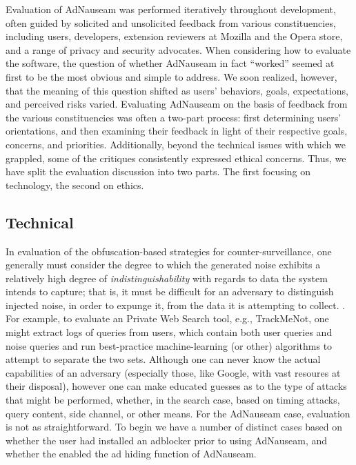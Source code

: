 \documentclass[conference]{IEEEtran}
\begin{document}
Evaluation of AdNauseam was performed iteratively throughout development, often guided by solicited and unsolicited feedback from various constituencies, including users, developers, extension reviewers at Mozilla and the Opera store, and a range of privacy and security advocates. When considering how to evaluate the software, the question of whether AdNauseam in fact ``worked'' seemed at first to be the most obvious and simple to address. We soon realized, however, that the meaning of this question shifted as users' behaviors, goals, expectations, and perceived risks varied. Evaluating AdNauseam on the basis of feedback from the various constituencies was often a two-part process: first determining users' orientations, and then examining their feedback in light of their respective goals, concerns, and priorities. Additionally, beyond the technical issues with which we grappled, some of the critiques consistently expressed ethical concerns. Thus, we have split the evaluation discussion into two parts. The first focusing on technology, the second on ethics.

\subsection{Technical}

%
%
In evaluation of the obfuscation-based strategies for counter-surveillance, one generally must consider the degree to which the generated noise exhibits a relatively high degree of \emph{indistinguishability} with regards to data the system intends to capture; that is, it must be difficult for an adversary to distinguish injected noise, in order to expunge it, from the data it is attempting to collect. \cite{Gervais,Balsa}. For example, to evaluate an Private Web Search tool, e.g., TrackMeNot\cite{Howe-2}, one might extract logs of queries from users, which contain both user queries and noise queries and run best-practice machine-learning (or other) algorithms to attempt to separate the two sets. Although one can never know the actual capabilities of an adversary (especially those, like Google, with vast resoures at their disposal), however one can make educated guesses as to the type of attacks that might be performed, whether, in the search case, based on timing attacks, query content, side channel, or other means. For the AdNauseam case, evaluation is not as straightforward. To begin we have a number of distinct cases based on whether the user had installed an adblocker prior to using AdNauseam, and whether the enabled the ad hiding function of AdNauseam.
\end{document}
